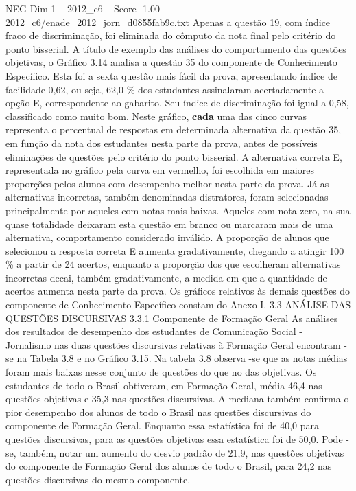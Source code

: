 \begin{textsample}{NEG Dim 1 – 2012\_c6 – Score -1.00 – 2012\_c6/enade\_2012\_jorn\_d0855fab9c.txt}
Apenas a questão 19, com índice fraco de discriminação, foi eliminada do cômputo da nota final pelo critério do ponto bisserial.
A título de exemplo das análises do comportamento das questões objetivas, o Gráfico 3.14 analisa a questão 35 do componente de Conhecimento Específico.
Esta foi a sexta questão mais fácil da prova, apresentando índice de facilidade 0,62, ou seja, 62,0 \% dos estudantes assinalaram acertadamente a opção E, correspondente ao gabarito.
Seu índice de discriminação foi igual a 0,58, classificado como muito bom.
Neste gráfico, \textbf{cada} uma das cinco curvas representa o percentual de respostas em determinada alternativa da questão 35, em função da nota dos estudantes nesta parte da prova, antes de possíveis eliminações de questões pelo critério do ponto bisserial.
A alternativa correta E, representada no gráfico pela curva em vermelho, foi escolhida em maiores proporções pelos alunos com desempenho melhor nesta parte da prova.
Já as alternativas incorretas, também denominadas distratores, foram selecionadas principalmente por aqueles com notas mais baixas.
Aqueles com nota zero, na sua quase totalidade deixaram esta questão em branco ou marcaram mais de uma alternativa, comportamento considerado inválido.
A proporção de alunos que selecionou a resposta correta E aumenta gradativamente, chegando a atingir 100 \% a partir de 24 acertos, enquanto a proporção dos que escolheram alternativas incorretas decai, também gradativamente, a medida em que a quantidade de acertos aumenta nesta parte da prova.
Os gráficos relativos às demais questões do componente de Conhecimento Específico constam do Anexo I. 3.3 ANÁLISE DAS QUESTÕES DISCURSIVAS 3.3.1 Componente de Formação Geral As análises dos resultados de desempenho dos estudantes de Comunicação Social - Jornalismo nas duas questões discursivas relativas à Formação Geral encontram -se na Tabela 3.8 e no Gráfico 3.15.
Na tabela 3.8 observa -se que as notas médias foram mais baixas nesse conjunto de questões do que no das objetivas.
Os estudantes de todo o Brasil obtiveram, em Formação Geral, média 46,4 nas questões objetivas e 35,3 nas questões discursivas.
A mediana também confirma o pior desempenho dos alunos de todo o Brasil nas questões discursivas do componente de Formação Geral.
Enquanto essa estatística foi de 40,0 para questões discursivas, para as questões objetivas essa estatística foi de 50,0.
Pode -se, também, notar um aumento do desvio padrão de 21,9, nas questões objetivas do componente de Formação Geral dos alunos de todo o Brasil, para 24,2 nas questões discursivas do mesmo componente.

\end{textsample}
